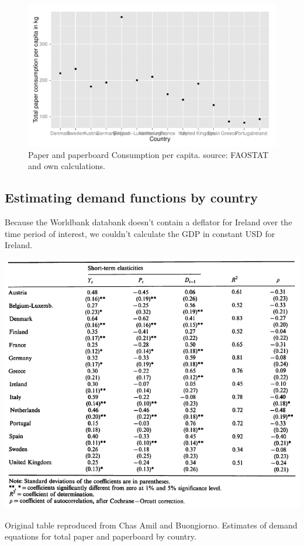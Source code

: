 \documentclass{scrartcl}\usepackage{graphicx, color}
\newenvironment{knitrout}{}{} %
\begin{document}
\begin{knitrout}
\color{fgcolor}\begin{figure}[h]


{\centering \includegraphics[width=.7\linewidth]{figure/ConsPerCapita} 

}

\caption[Paper and paperboard Consumption per capita]{Paper and paperboard Consumption per capita. source: FAOSTAT and own calculations.\label{fig:ConsPerCapita}}
\end{figure}


\end{knitrout}


\newpage
\subsection{Estimating demand functions by country}
Because the Worldbank databank doesn't contain a deflator for Ireland over the time period of interest, we couldn't calculate the GDP in constant USD for Ireland.
\begin{table}[h]
\centering
\includegraphics[width=0.7\linewidth]{./figure/ChasAmilEstimationTable1}
\caption{Original table reproduced from Chas Amil and Buongiorno. Estimates of demand equations for total paper and paperboard by country.}
\label{fig:ChasAmilEstimationTable1}
\end{table}
    
\end{document}

